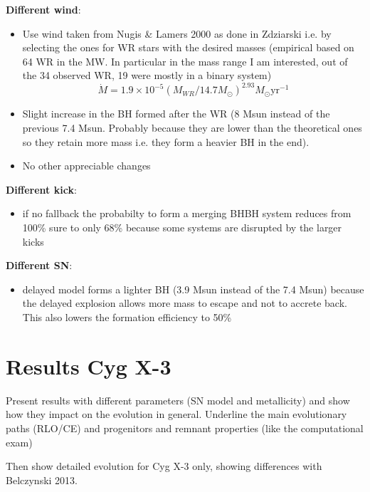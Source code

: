 \documentclass[a4paper,titlepage]{book}     	%
\newcommand{\sun}{\ensuremath{_\odot}}
\newcommand{\msun}{\ensuremath{M\sun}}
\newcommand{\yr}{\text{yr}}
\begin{document}
\textbf{Different wind}:\\
\begin{itemize}
	\item Use wind taken from Nugis \& Lamers 2000 as done in Zdziarski i.e. by selecting the ones for WR stars with the desired masses (empirical based on 64 WR in the MW. In particular in the mass range I am interested, out of the 34 observed WR, 19 were mostly in a binary system)
	\[\dot{M} = 1.9\times10^{-5}(M_{WR}/14.7\msun)^{2.93} \msun \yr^{-1}\]
	\item Slight increase in the BH formed after the WR (8 Msun instead of the previous 7.4 Msun. Probably because they are lower than the theoretical ones so they retain more mass i.e. they form a heavier BH in the end). 
	\item No other appreciable changes
\end{itemize}

\textbf{Different kick}:
\begin{itemize}
	\item if no fallback the probabilty to form a merging BHBH system reduces from 100\% sure to only 68\% because some systems are disrupted by the larger kicks
\end{itemize}


\textbf{Different SN}:
\begin{itemize}
	\item delayed model forms a lighter BH (3.9 Msun instead of the 7.4 Msun) because the delayed explosion allows more mass to escape and not to accrete back. This also lowers the formation efficiency to 50\% 
\end{itemize}





\section{Results Cyg X-3}
Present results with different parameters (SN model and metallicity) and show how they impact on the evolution in general. Underline the main evolutionary paths (RLO/CE) and progenitors and remnant properties (like the computational exam)

Then show detailed evolution for Cyg X-3 only, showing differences with Belczynski 2013.





\printbibliography[heading=bibintoc]
\end{document}
